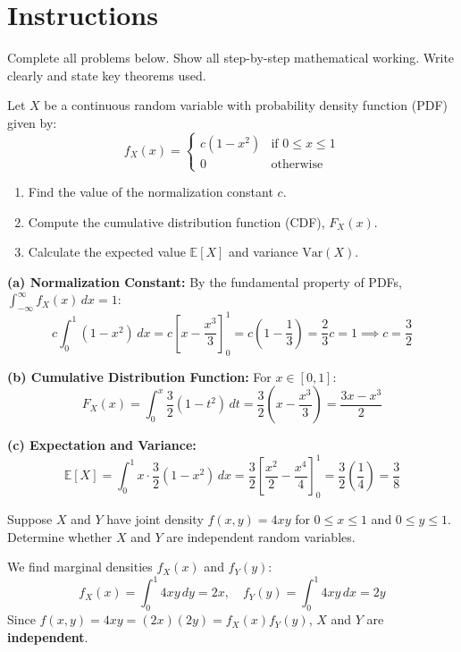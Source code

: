 \documentclass[mode=worksheet, palette=emerald, fontsize=11pt, showsolutions=true]{modernclassnotes}
\begin{document}
\maketitle

\section*{Instructions}
Complete all problems below. Show all step-by-step mathematical working. Write clearly and state key theorems used.

\begin{exercise}
Let $X$ be a continuous random variable with probability density function (PDF) given by:
\[
f_X(x) =
\begin{cases}
c (1 - x^2) & \text{if } 0 \le x \le 1 \\
0 & \text{otherwise}
\end{cases}
\]
\begin{enumerate}[label=(\alph*)]
    \item Find the value of the normalization constant $c$.
    \item Compute the cumulative distribution function (CDF), $F_X(x)$.
    \item Calculate the expected value $\mathbb{E}[X]$ and variance $\text{Var}(X)$.
\end{enumerate}
\end{exercise}

\begin{solution}
\textbf{(a) Normalization Constant:}
By the fundamental property of PDFs, $\int_{-\infty}^{\infty} f_X(x) \, dx = 1$:
\[
c \int_{0}^{1} (1 - x^2) \, dx = c \left[ x - \frac{x^3}{3} \right]_0^1 = c \left( 1 - \frac{1}{3} \right) = \frac{2}{3} c = 1 \implies c = \frac{3}{2}
\]

\textbf{(b) Cumulative Distribution Function:}
For $x \in [0, 1]$:
\[
F_X(x) = \int_{0}^{x} \frac{3}{2}(1 - t^2) \, dt = \frac{3}{2}\left( x - \frac{x^3}{3} \right) = \frac{3x - x^3}{2}
\]

\textbf{(c) Expectation and Variance:}
\[
\mathbb{E}[X] = \int_{0}^{1} x \cdot \frac{3}{2}(1 - x^2) \, dx = \frac{3}{2} \left[ \frac{x^2}{2} - \frac{x^4}{4} \right]_0^1 = \frac{3}{2} \left( \frac{1}{4} \right) = \frac{3}{8}
\]
\end{solution}

\begin{exercise}
Suppose $X$ and $Y$ have joint density $f(x, y) = 4xy$ for $0 \le x \le 1$ and $0 \le y \le 1$.
Determine whether $X$ and $Y$ are independent random variables.
\end{exercise}

\begin{solution}
We find marginal densities $f_X(x)$ and $f_Y(y)$:
\[
f_X(x) = \int_0^1 4xy \, dy = 2x, \quad f_Y(y) = \int_0^1 4xy \, dx = 2y
\]
Since $f(x,y) = 4xy = (2x)(2y) = f_X(x) f_Y(y)$, $X$ and $Y$ are \textbf{independent}.
\end{solution}
\end{document}
